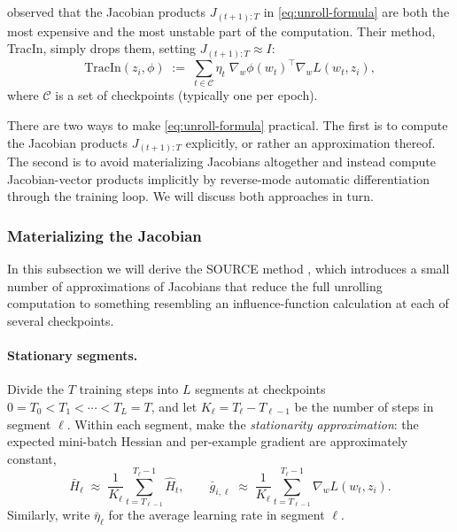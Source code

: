 \documentclass[11pt]{article}
\begin{document}
\begin{remark}[TracIn]\label{rem:tracin}
\citet{pruthi2020estimating} observed that the Jacobian products $J_{(t+1):T}$ in \eqref{eq:unroll-formula} are both the most expensive and the most unstable part of the computation. Their method, TracIn, simply drops them, setting $J_{(t+1):T} \approx I$:
\begin{equation}\label{eq:tracin}
  \mathrm{TracIn}(z_i,\phi) \;:=\; \sum_{t\in\mathcal{C}}\eta_t\;\nabla_w\phi(w_t)^\top\nabla_w L(w_t,z_i),
\end{equation}
where $\mathcal{C}$ is a set of checkpoints (typically one per epoch).
\end{remark}

There are two ways to make \eqref{eq:unroll-formula} practical. The first is to compute the Jacobian products $J_{(t+1):T}$ explicitly, or rather an approximation thereof. The second is to avoid materializing Jacobians altogether and instead compute Jacobian-vector products implicitly by reverse-mode automatic differentiation through the training loop. We will discuss both approaches in turn.

\subsubsection{Materializing the Jacobian}\label{subsec:explicit-unroll}

In this subsection we will derive the SOURCE method \citep{bae2024source}, which introduces a small number of approximations of Jacobians that reduce the full unrolling computation to something resembling an influence-function calculation at each of several checkpoints.

\paragraph{Stationary segments.} Divide the $T$ training steps into $L$ segments at checkpoints $0 = T_0 < T_1 < \cdots < T_L = T$, and let $K_\ell = T_\ell - T_{\ell-1}$ be the number of steps in segment $\ell$. Within each segment, make the \emph{stationarity approximation}: the expected mini-batch Hessian and per-example gradient are approximately constant,
\begin{equation}\label{eq:stationary-approx}
  \bar{H}_\ell \;\approx\; \frac{1}{K_\ell}\sum_{t=T_{\ell-1}}^{T_\ell - 1}\widehat{H}_t, \qquad \bar{g}_{i,\ell} \;\approx\; \frac{1}{K_\ell}\sum_{t=T_{\ell-1}}^{T_\ell - 1}\nabla_w L(w_t,z_i).
\end{equation}
Similarly, write $\bar\eta_\ell$ for the average learning rate in segment $\ell$.
\end{document}
